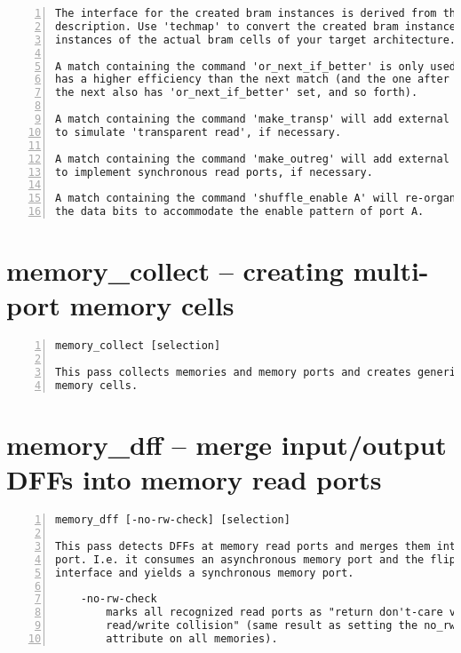 \begin{lstlisting}[numbers=left,frame=single]
The interface for the created bram instances is derived from the bram
description. Use 'techmap' to convert the created bram instances into
instances of the actual bram cells of your target architecture.

A match containing the command 'or_next_if_better' is only used if it
has a higher efficiency than the next match (and the one after that if
the next also has 'or_next_if_better' set, and so forth).

A match containing the command 'make_transp' will add external circuitry
to simulate 'transparent read', if necessary.

A match containing the command 'make_outreg' will add external flip-flops
to implement synchronous read ports, if necessary.

A match containing the command 'shuffle_enable A' will re-organize
the data bits to accommodate the enable pattern of port A.
\end{lstlisting}

\section{memory\_collect -- creating multi-port memory cells}
\label{cmd:memory_collect}
\begin{lstlisting}[numbers=left,frame=single]
    memory_collect [selection]

This pass collects memories and memory ports and creates generic multiport
memory cells.
\end{lstlisting}

\section{memory\_dff -- merge input/output DFFs into memory read ports}
\label{cmd:memory_dff}
\begin{lstlisting}[numbers=left,frame=single]
    memory_dff [-no-rw-check] [selection]

This pass detects DFFs at memory read ports and merges them into the memory
port. I.e. it consumes an asynchronous memory port and the flip-flops at its
interface and yields a synchronous memory port.

    -no-rw-check
        marks all recognized read ports as "return don't-care value on
        read/write collision" (same result as setting the no_rw_check
        attribute on all memories).
\end{lstlisting}

